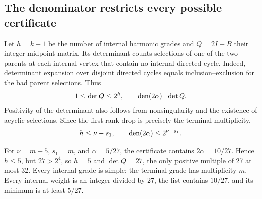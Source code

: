 \subsection{The denominator restricts every possible certificate}
Let $h=k-1$ be the number of internal harmonic grades and $Q=2I-B$ their integer midpoint matrix. Its determinant counts selections of one of the two parents at each internal vertex that contain no internal directed cycle. Indeed, determinant expansion over disjoint directed cycles equals inclusion--exclusion for the bad parent selections. Thus
\begin{equation}\label{eq:detbudget}
 1\le\det Q\le2^h,\qquad \operatorname{den}(2\alpha)\mid\det Q.
\end{equation}
Positivity of the determinant also follows from nonsingularity and the existence of acyclic selections. Since the first rank drop is precisely the terminal multiplicity,
\begin{equation}\label{eq:profilebudget}
 h\le\nu-s_1,\qquad \operatorname{den}(2\alpha)\le2^{\nu-s_1}.
\end{equation}

For $\nu=m+5$, $s_1=m$, and $\alpha=5/27$, the certificate contains $2\alpha=10/27$. Hence $h\le5$, but $27>2^4$, so $h=5$ and $\det Q=27$, the only positive multiple of 27 at most 32. Every internal grade is simple; the terminal grade has multiplicity $m$. Every internal weight is an integer divided by 27, the list contains $10/27$, and its minimum is at least $5/27$.

